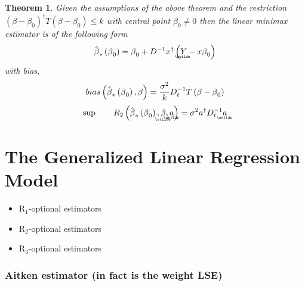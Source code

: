\documentclass{article}
\newtheorem{theorem}{Theorem}
\begin{document}
\begin{theorem}
Given the assumptions of the above theorem and the restriction $\left( \beta
-\beta _{0}\right) ^{\dagger }T\left( \beta -\beta _{0}\right) \leq k$ with
central point $\beta _{0}\neq 0$ then the linear minimax estimator is of the
following form%
\begin{equation*}
\hat{\beta}_{\ast }\left( \beta _{0}\right) =\beta _{0}+D^{-1}x^{\dagger
}\left( 
\underaccent{\wtilde}{Y}%
-x\beta _{0}\right) 
\end{equation*}%
with bias,%
\begin{equation*}
bias\left( \hat{\beta}_{\ast }\left( \beta _{0}\right) ,\beta \right) =\frac{%
\sigma ^{2}}{k}D_{t}^{-1}T\left( \beta -\beta _{0}\right) 
\end{equation*}%
\begin{equation*}
\sup \qquad R_{2}\left( \hat{\beta}_{\ast }\left( \beta _{0}\right) ,%
\underaccent{\wtilde}{\beta}%
,%
\underaccent{\wtilde}{a}%
\right) =\sigma ^{2}a^{\dagger }D_{t}^{-1}%
\underaccent{\wtilde}{a}%
\end{equation*}
\end{theorem}

\bigskip 

\bigskip 

\part{The Generalized Linear Regression Model}

\bigskip

\begin{itemize}
\item R$_{1}$-optional estimators

\item R$_{2}$-optional estimators

\item R$_{3}$-optional estimators
\end{itemize}

\section{Aitken estimator (in fact is the weight LSE)}
\end{document}
